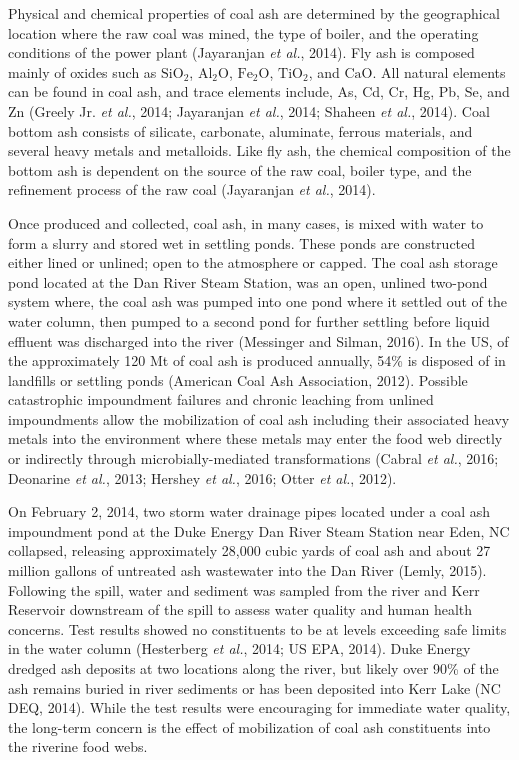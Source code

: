 \documentclass[ms, hidelinks]{uncgdissertationexp}
\theoremstyle{plain}
\theoremstyle{definition}
\theoremstyle{remark}
\begin{document}
Physical and chemical properties of coal ash are determined by the geographical location where the raw coal was mined, the type of boiler, and the operating conditions of the power plant (Jayaranjan \emph{et al.}, 2014). Fly ash is composed mainly of oxides such as \(\mathrm{SiO_2}\), \(\mathrm{Al_2O}\), \(\mathrm{Fe_2O}\), \(\mathrm{TiO_2}\), and \(\mathrm{CaO}\). All natural elements can be found in coal ash, and trace elements include, As, Cd, Cr, Hg, Pb, Se, and Zn (Greely Jr. \emph{et al.}, 2014; Jayaranjan \emph{et al.}, 2014; Shaheen \emph{et al.}, 2014). Coal bottom ash consists of silicate, carbonate, aluminate, ferrous materials, and several heavy metals and metalloids. Like fly ash, the chemical composition of the bottom ash is dependent on the source of the raw coal, boiler type, and the refinement process of the raw coal (Jayaranjan \emph{et al.}, 2014).

Once produced and collected, coal ash, in many cases, is mixed with water to form a slurry and stored wet in settling ponds. These ponds are constructed either lined or unlined; open to the atmosphere or capped. The coal ash storage pond located at the Dan River Steam Station, was an open, unlined two-pond system where, the coal ash was pumped into one pond where it settled out of the water column, then pumped to a second pond for further settling before liquid effluent was discharged into the river (Messinger and Silman, 2016). In the US, of the approximately 120 Mt of coal ash is produced annually, 54\% is disposed of in landfills or settling ponds (American Coal Ash Association, 2012). Possible catastrophic impoundment failures and chronic leaching from unlined impoundments allow the mobilization of coal ash including their associated heavy metals into the environment where these metals may enter the food web directly or indirectly through microbially-mediated transformations (Cabral \emph{et al.}, 2016; Deonarine \emph{et al.}, 2013; Hershey \emph{et al.}, 2016; Otter \emph{et al.}, 2012).

On February 2, 2014, two storm water drainage pipes located under a coal ash impoundment pond at the Duke Energy Dan River Steam Station near Eden, NC collapsed, releasing approximately 28,000 cubic yards of coal ash and about 27 million gallons of untreated ash wastewater into the Dan River (Lemly, 2015). Following the spill, water and sediment was sampled from the river and Kerr Reservoir downstream of the spill to assess water quality and human health concerns. Test results showed no constituents to be at levels exceeding safe limits in the water column (Hesterberg \emph{et al.}, 2014; US EPA, 2014). Duke Energy dredged ash deposits at two locations along the river, but likely over 90\% of the ash remains buried in river sediments or has been deposited into Kerr Lake (NC DEQ, 2014). While the test results were encouraging for immediate water quality, the long-term concern is the effect of mobilization of coal ash constituents into the riverine food webs.
\end{document}
